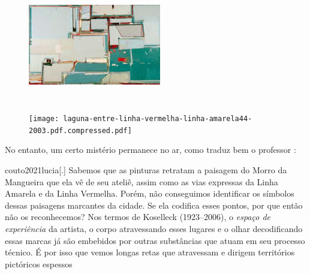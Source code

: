 \begin{figure}
	\begin{minipage}[b]{.45\linewidth}
		\caption{}
		\includegraphics[width=2.2769in,height=1.96429in]{figuras/laguna-entre-linha-vermelha-linha-amarela14-2003.pdf.compressed.pdf}

	\end{minipage}\hfill
	\begin{minipage}[b]{.45\linewidth}
		\caption{}
		\texttt{[image: laguna-entre-linha-vermelha-linha-amarela44-2003.pdf.compressed.pdf]}
	\end{minipage}
\end{figure}

No entanto, um certo mistério permanece no ar, como traduz bem o
professor \textcite{couto2021lucia}:

\begin{displaycquote}{couto2021lucia}[.]
	Sabemos que as pinturas retratam a paisagem do Morro da Mangueira que
	ela vê de seu ateliê, assim como as vias expressas da Linha Amarela e da
	Linha Vermelha. Porém, não conseguimos identificar os símbolos dessas
	paisagens marcantes da cidade. Se ela codifica esses pontos, por que
	então não os reconhecemos? Nos termos de Koselleck (1923--2006), o
	\emph{espaço de experiência} da artista, o corpo atravessando esses
	lugares e o olhar decodificando essas marcas já são embebidos por outras
	substâncias que atuam em seu processo técnico. É por isso que vemos
	longas retas que atravessam e dirigem territórios pictóricos espessos
\end{displaycquote}

